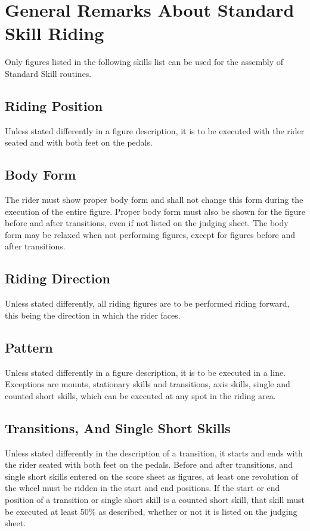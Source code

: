 \section{General Remarks About Standard Skill Riding}
Only figures listed in the following skills list can be used for the assembly of Standard Skill routines.

\subsection{Riding Position}
Unless stated differently in a figure description, it is to be executed with the rider seated and with both feet on the pedals.

\subsection{Body Form}
The rider must show proper body form and shall not change this form during the execution of the entire figure.
Proper body form must also be shown for the figure before and after transitions, even if not listed on the judging sheet.
The body form may be relaxed when not performing figures, except for figures before and after transitions.

\subsection{Riding Direction}
Unless stated differently, all riding figures are to be performed riding forward, this being the direction in which the rider faces.

\subsection{Pattern}
Unless stated differently in a figure description, it is to be executed in a line.
Exceptions are mounts, stationary skills and transitions, axis skills, single and counted short skills, which can be executed at any spot in the riding area.

\subsection{Transitions, And Single Short Skills}
Unless stated differently in the description of a transition, it starts and ends with the rider seated with both feet on the pedals.
Before and after transitions, and single short skills entered on the score sheet as figures, at least one revolution of the wheel must be ridden in the start and end positions.
If the start or end position of a transition or single short skill is a counted short skill, that skill must be executed at least 50\% as described, whether or not it is listed on the judging sheet.


